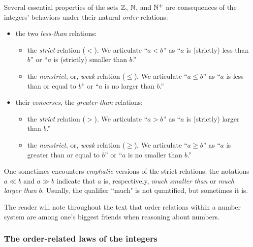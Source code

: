 Several essential properties of the sets $\mathbb{Z}$, $\mathbb{N}$, and $\mathbb{N}^+$ are consequences of the integers' behaviors under their natural {\em order} relations:
\begin{itemize}
\item
the two {\em less-than} relations:
  \begin{itemize}
  \item
the {\em strict} relation ($<$).  We articulate ``$a < b$'' as ``$a$ is (strictly) less than $b$'' or ``$a$ is (strictly) smaller than $b$.''
  \medskip\item
the {\em nonstrict}, or, {\em weak} relation ($\leq$).  We articulate ``$a \leq b$'' as ``$a$ is less than or equal to $b$'' or ``$a$ is no larger than $b$.''
  \end{itemize}
 

\medskip\item
their {\em converses,} the {\em greater-than} relations:
  \begin{itemize}
  \item
the {\em strict} relation ($>$).  We articulate ``$a > b$'' as ``$a$ is (strictly) larger than $b$.''
  \medskip\item
the {\em nonstrict}, or, {\em weak} relation ($\geq$).  We articulate ``$a \geq b$'' as ``$a$ is greater than or equal to $b$'' or ``$a$ is no smaller than $b$.''
  \end{itemize}
\end{itemize}
One sometimes encounters {\em emphatic} versions of the strict relations: the notations $a \ll b$ and $a \gg b$ indicate that $a$ is, respectively, {\em much smaller than} or {\em much larger than} $b$.  Usually, the qualifier ``much" is not quantified, but sometimes it is.

\smallskip

The reader will note throughout the text that order relations within a number system are among one's biggest friends when reasoning about numbers.  

\subsubsection{The order-related laws of the integers}
\label{sec:order-laws}

